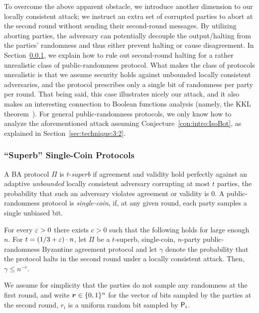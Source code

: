 To overcome the above apparent obstacle, we introduce another dimension to our locally consistent attack; we instruct an extra set of corrupted parties to abort at the second round without sending their second-round messages. By utilizing aborting parties, the adversary can potentially decouple the output/halting from the parties' randomness and thus either prevent halting or cause disagreement.
In Section~\ref{sec:technique:3:1}, we explain how to rule out second-round halting for a rather unrealistic class of public-randomness protocol. What makes the class of protocols unrealistic is that we assume security holds against unbounded locally consistent adversaries, and the protocol prescribes only a single bit of randomness per party per round. That being said, this case illustrates nicely our attack, and it also makes an interesting connection to Boolean functions analysis (namely, the KKL theorem~\cite{KKL88}). For general public-randomness protocols, we only know how to analyze the aforementioned attack assuming Conjecture~\ref{con:intro:IsoBot}, as explained in Section~\ref{sec:technique:3:2}.

\subsubsection{``Superb'' Single-Coin Protocols}\label{sec:technique:3:1}
A BA protocol $\Pi$ is $t$-\emph{superb} if agreement and validity hold perfectly against an adaptive \emph{unbounded} locally consistent adversary corrupting at most $t$ parties, \ie the probability that such an adversary violates agreement or validity
is $0$. A public-randomness protocol is \emph{single-coin}, if, at any given round, each party samples a single unbiased bit.

\begin{theorem}\label{bound:KKL}
For every $\varepsilon> 0$ there exists $c>0$ such that the following holds for large enough $n$. For $t=(1/3+\varepsilon) \cdot n$, let $\Pi$ be a $t$-superb, single-coin, $n$-party public-randomness Byzantine agreement protocol and let $\gamma$ denote the probability that the protocol halts in the second round under a locally consistent attack. Then, $\gamma\le n^{-c}$.
\end{theorem}

We assume for simplicity that the parties do not sample any randomness at the first round, and write ${ \boldsymbol{r}}\in {\{0,1\}^n}$ for the vector of bits sampled by the parties at the second round, \ie $r_i$ is a uniform random bit sampled by $\mathsf{P}_i$.


